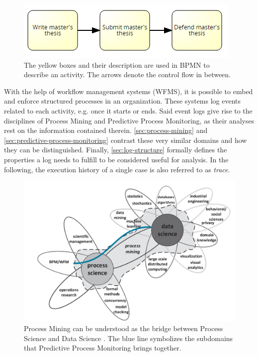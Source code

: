 \begin{figure}
    \centering
    \includegraphics[width=.75\textwidth]{gfx/activity-introduction.png}
    \caption{The yellow boxes and their description are used in BPMN to describe an activity. The arrows denote the control flow in between.}
    \label{fig:activity-introduction}
\end{figure}

With the help of workflow management systems (WFMS), it is possible to embed and enforce structured processes in an organization. These systems log events related to each activity, e.g. once it starts or ends. Said event logs give rise to the disciplines of Process Mining and Predictive Process Monitoring, as their analyses rest on the information contained therein\cite{Aalst2016}. \autoref{sec:process-mining} and \autoref{sec:predictive-process-monitoring} contrast these very similar domains and how they can be distinguished. Finally, \autoref{sec:log-structure} formally defines the properties a log needs to fulfill to be considered useful for analysis. In the following, the execution history of a single case is also referred to as \textit{trace}.

\begin{figure}
    \centering
    \includegraphics[width=.8\textwidth]{gfx/process-data-science.png}
    \caption{Process Mining can be understood as the bridge between Process Science and Data Science \cite[p.18]{Aalst2016}. The blue line symbolizes the subdomains that Predictive Process Monitoring brings together.}
    \label{fig:process-data-science}
\end{figure}

